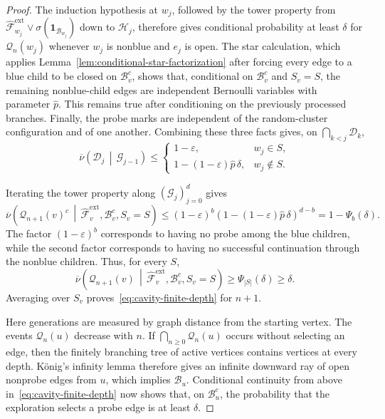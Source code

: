 \documentclass[10pt,a4paper]{amsart}
\begin{document}
\begin{proof}
The induction hypothesis at $w_j$, followed by the tower property from $\widehat{\mathcal F}_{w_j}^{\mathrm{ext}}\vee\sigma(\mathbf 1_{\mathcal B_{w_j}})$ down to $\mathcal H_j$, therefore gives conditional probability at least $\delta$ for $\mathcal Q_n(w_j)$ whenever $w_j$ is nonblue and $e_j$ is open. The star calculation, which applies Lemma~\ref{lem:conditional-star-factorization} after forcing every edge to a blue child to be closed on $\mathcal B_v^c$, shows that, conditional on $\mathcal B_v^c$ and $S_v=S$, the remaining nonblue-child edges are independent Bernoulli variables with parameter $\widehat p$. This remains true after conditioning on the previously processed branches. Finally, the probe marks are independent of the random-cluster configuration and of one another. Combining these three facts gives, on $\bigcap_{k<j}\mathcal D_k$,
\[
    \overline\nu\left(
        \mathcal D_j
        \,\middle|\,
        \mathcal G_{j-1}
    \right)
    \le
    \begin{cases}
        1-\varepsilon,
        & w_j\in S,\\
        1-(1-\varepsilon)\widehat p\,\delta,
        & w_j\notin S.
    \end{cases}
\]

Iterating the tower property along $(\mathcal G_j)_{j=0}^d$ gives
\[
    \overline\nu\left(
        \mathcal Q_{n+1}(v)^c
        \,\middle|\,
        \widehat{\mathcal F}_v^{\mathrm{ext}},
        \mathcal B_v^c,
        S_v=S
    \right)
    \le
    (1-\varepsilon)^b
    \left(
        1-(1-\varepsilon)\widehat p\,\delta
    \right)^{d-b}
    =
    1-\Psi_b(\delta).
\]
The factor $(1-\varepsilon)^b$ corresponds to having no probe among the blue children, while the second factor corresponds to having no successful continuation through the nonblue children. Thus, for every $S$,
\[
    \overline\nu\left(
        \mathcal Q_{n+1}(v)
        \,\middle|\,
        \widehat{\mathcal F}_v^{\mathrm{ext}},
        \mathcal B_v^c,
        S_v=S
    \right)
    \ge
    \Psi_{|S|}(\delta)
    \ge
    \delta.
\]
Averaging over $S_v$ proves~\eqref{eq:cavity-finite-depth} for $n+1$.

Here generations are measured by graph distance from the starting vertex. The events $\mathcal Q_n(u)$ decrease with $n$. If $\bigcap_{n\ge0}\mathcal Q_n(u)$ occurs without selecting an edge, then the finitely branching tree of active vertices contains vertices at every depth. K\"onig's infinity lemma therefore gives an infinite downward ray of open nonprobe edges from $u$, which implies $\mathcal B_u$. Conditional continuity from above in~\eqref{eq:cavity-finite-depth} now shows that, on $\mathcal B_u^c$, the probability that the exploration selects a probe edge is at least $\delta$.


\end{proof}
\end{document}

